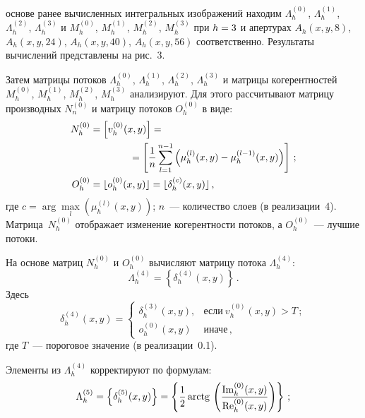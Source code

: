 \begin{multicols}{2}

\noindent
 основе ранее вычисленных интегральных 
изоб\-ра\-же\-ний находим $\Lambda_h^{(0)}$, $\Lambda_h^{(1)}$,  $\Lambda_h^{(2)}$, 
$\Lambda_h^{(3)}$ и $M_h^{(0)}$, $M_h^{(1)}$, $M_h^{(2)}$, $M_h^{(3)}$ при 
$h\hm=3$ и апертурах $A_h(x,y,8)$, $A_h(x,y,24)$, $A_h(x,y,40)$, $A_h(x,y,56)$ 
соответственно. Результаты вычислений представлены на рис.~3.
  
  Затем матрицы потоков $\Lambda_h^{(0)}$, $\Lambda_h^{(1)}$,  $\Lambda_h^{(2)}$, 
$\Lambda_h^{(3)}$ и матрицы когерентностей $M_h^{(0)}$, $M_h^{(1)}$, $M_h^{(2)}$, 
$M_h^{(3)}$ анализируют. Для этого рассчитывают матрицу производных 
$N_n^{(0)}$ и мат\-ри\-цу потоков $O_h^{(0)}$ в виде:
  \begin{align*}
  N_h^{(0)} &= \left [ v_h^{(0)}(x,y)\right] ={}\\
  &\hspace*{14mm}{}=\left[ \fr{1}{n}\sum\limits_{l=1}^{n-
1} \left( \mu_h^{(l)}(x,y)-\mu_h^{(l-1)}(x,y)\right)\right]\,;\\
  O_h^{(0)} &= \lfloor o_h^{(0)}(x,y)\rfloor =\lfloor \delta_h^{(c)}(x,y)\rfloor\,,
  \end{align*}
где $c=\arg \max\limits_l \left( \mu_h^{(l)}(x,y)\right)$; $n$~--- количество слоев 
(в реализации~4). Матрица~$N_h^{(0)}$ отображает изменение когерентности 
потоков, а $O_h^{(0)}$~--- лучшие потоки.
  
  На основе матриц $N_h^{(0)}$ и $O_h^{(0)}$ вычисляют матрицу потока 
$\Lambda_h^{(4)}$: 
\begin{equation}
 \Lambda_h^{(4)} =\left\{ \delta_h^{(4)} (x,y)\right\}\,.
 \label{e11-g}
 \end{equation}
 Здесь
 \begin{equation*}
  \delta_h^{(4)}(x,y)=
  \begin{cases}
\delta_h^{(3)}(x,y), &\mbox{если}\ v_h^{(0)}(x,y)>T\,;\\
  o_h^{(0)}(x,y) & \mbox{иначе}\,,
  \end{cases}
  \end{equation*}
где $T$~--- пороговое значение (в реализации~0.1).
  
  Элементы из $\Lambda_h^{(4)}$ корректируют по формулам:
  \begin{equation*}
  \Lambda_h^{(5)} = \left\{ \delta_h^{(5)}(x,y)\right\}= \left\{ \displaystyle\frac{\displaystyle 1\mathstrut}{\displaystyle 2\mathstrut}\,\mathrm{arctg}\,\left( 
\displaystyle\frac{\displaystyle \mathrm{Im}_h^{(0)}(x,y)\mathstrut}{\displaystyle \mathrm{Re}_h^{(0)}(x,y)\mathstrut}\right)\right\}\,;
\end{equation*}


\end{multicols}

